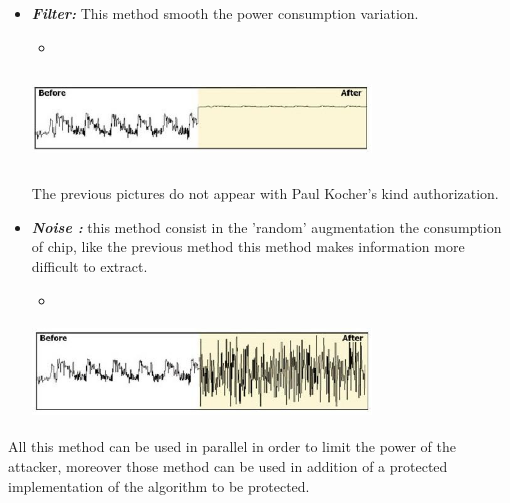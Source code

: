 \begin{itemize}
\item \textbf{\textit{Filter:}} This method smooth the power consumption variation. 

\begin{itemize}
	\item[] 
\end{itemize}
	\begin{center}
		\includegraphics[width=90mm,height=25mm]{images/cri2.jpg}
	\end{center}
The previous pictures do not appear with Paul Kocher's kind authorization. 

\item \textbf{\textit{Noise :}} 
this method consist in the 'random' augmentation the consumption of chip, 
like the previous method this method makes information more difficult to extract.

\begin{itemize}
	\item[] 
\end{itemize}
	\begin{center}
		\includegraphics[width=90mm,height=25mm]{images/cri.jpg}
	\end{center}
	
\end{itemize}
All this method can be used in parallel in order to limit the power of the attacker, 
moreover those method can be used in addition of a protected implementation of the 
algorithm to be protected.
